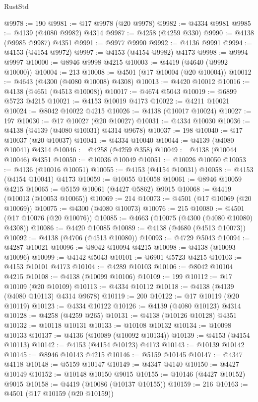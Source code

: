 \begin{lexlean}{RustStd}
\begin{coremodule}
@9978 := 190
@9981 := @17 @9978 (@20 @9978)
@9982 := @4334 @9981
@9985 := @4139 (@4080 @9982) @4314
@9987 := @4258 (@4259 @330)
@9990 := @4138 (@9985 @9987) @4351
@9991 := @9977 @9990
@9992 := @4136 @9991
@9994 := @4153 (@4154 @9972)
@9997 := @4153 (@4154 @9982) @4173
@9998 := @9994 @9997
@10000 := @8946 @9998 @4215
@10003 := @4419 (@4640 (@9992 @10000))
@10004 := 213
@10008 := @4501 (@17 @10004 (@20 @10004))
@10012 := @4643 (@4300 (@4080 @10008) @4308)
@10013 := @4420 @10012
@10016 := @4138 (@4651 (@4513 @10008))
@10017 := @4674 @5043
@10019 := @6899 @5723 @4215
@10021 := @4153 @10019 @4173
@10022 := @4211 @10021
@10024 := @8042 @10022 @4215
@10026 := @4138 (@10017 @10024)
@10027 := 197
@10030 := @17 @10027 (@20 @10027)
@10031 := @4334 @10030
@10036 := @4138 (@4139 (@4080 @10031) @4314 @9678)
@10037 := 198
@10040 := @17 @10037 (@20 @10037)
@10041 := @4334 @10040
@10044 := @4139 (@4080 @10041) @4314
@10046 := @4258 (@4259 @358)
@10049 := @4138 (@10044 @10046) @4351
@10050 := @10036 @10049
@10051 := @10026 @10050
@10053 := @4136 (@10016 @10051)
@10055 := @4153 (@4154 @10031)
@10058 := @4153 (@4154 @10041) @4173
@10059 := @10055 @10058
@10061 := @8946 @10059 @4215
@10065 := @5159 @10061 (@4427 @5862) @9015
@10068 := @4419 (@10013 (@10053 @10065))
@10069 := 214
@10073 := @4501 (@17 @10069 (@20 @10069))
@10075 := @4300 (@4080 @10073)
@10076 := 215
@10080 := @4501 (@17 @10076 (@20 @10076))
@10085 := @4663 (@10075 (@4300 (@4080 @10080) @4308))
@10086 := @4420 @10085
@10089 := @4138 (@4680 (@4513 @10073))
@10092 := @4138 (@4706 (@4513 @10080))
@10093 := @4729 @5043
@10094 := @4287 @10021
@10096 := @8042 @10094 @4215
@10098 := @4138 (@10093 @10096)
@10099 := @4142 @5043
@10101 := @6901 @5723 @4215
@10103 := @4153 @10101 @4173
@10104 := @4289 @10103
@10106 := @8042 @10104 @4215
@10108 := @4138 (@10099 @10106)
@10109 := 199
@10112 := @17 @10109 (@20 @10109)
@10113 := @4334 @10112
@10118 := @4138 (@4139 (@4080 @10113) @4314 @9678)
@10119 := 200
@10122 := @17 @10119 (@20 @10119)
@10123 := @4334 @10122
@10126 := @4139 (@4080 @10123) @4314
@10128 := @4258 (@4259 @265)
@10131 := @4138 (@10126 @10128) @4351
@10132 := @10118 @10131
@10133 := @10108 @10132
@10134 := @10098 @10133
@10137 := @4136 (@10089 (@10092 @10134))
@10139 := @4153 (@4154 @10113)
@10142 := @4153 (@4154 @10123) @4173
@10143 := @10139 @10142
@10145 := @8946 @10143 @4215
@10146 := @5159 @10145
@10147 := @4347 @4118
@10148 := @5159 @10147
@10149 := @4347 @4140
@10150 := @4427 @10149
@10152 := @10148 @10150 @9015
@10155 := @10146 (@4427 @10152) @9015
@10158 := @4419 (@10086 (@10137 @10155))
@10159 := 216
@10163 := @4501 (@17 @10159 (@20 @10159))

\end{coremodule}
\end{lexlean}
